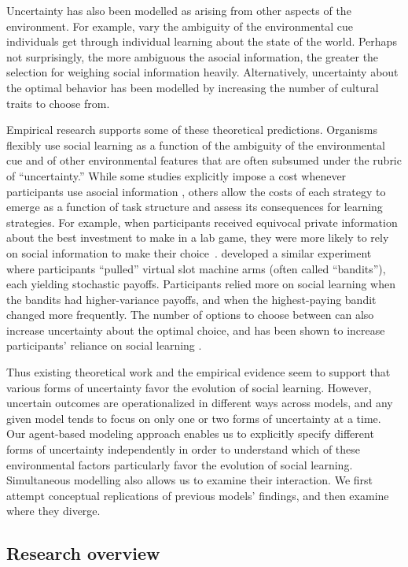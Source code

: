 \documentclass[letterpaper,11.5pt]{scrartcl}
\begin{document}
Uncertainty has also been modelled as arising from other aspects of the environment. 
For example,  vary the ambiguity of the environmental cue individuals get through individual learning about the state of the world. Perhaps not surprisingly, the more ambiguous the asocial information, the greater the selection for weighing social information heavily. Alternatively, uncertainty about the optimal behavior has been modelled by increasing the number of cultural traits to choose from. 

Empirical research supports some of these theoretical predictions. Organisms flexibly use social learning as a function of the ambiguity of the environmental cue and of other environmental features that are often subsumed under the rubric of ``uncertainty.''
While some studies explicitly impose a cost whenever participants use asocial
information \cite{Morgan2012,Atkisson2012}, 
others allow the costs of each strategy to emerge as a function of task structure and assess its consequences for learning strategies. 
For example, when participants received equivocal private information about the best investment to make in a lab game,
they were more likely to rely on social information to make their choice~\cite{Toelch2013}. 
 developed a similar experiment where participants ``pulled'' virtual slot machine arms (often called ``bandits''), each yielding stochastic payoffs. Participants relied more on social learning when the bandits had higher-variance payoffs, and when the highest-paying bandit changed more frequently. 
The number of options to choose between can also increase uncertainty about the optimal choice, and has been shown to increase participants' reliance on social learning \cite{Muthukrishna2016a}. 

Thus existing theoretical work and the empirical evidence seem to support that various forms of uncertainty favor the evolution of social learning. However, uncertain outcomes are operationalized in different ways across models, and any given model tends to focus on only one or two forms of uncertainty at a time. Our agent-based modeling approach enables us to explicitly specify different forms of uncertainty independently in order to understand which of these environmental factors particularly favor the evolution of social learning. Simultaneous modelling also allows us to examine their interaction. We first attempt conceptual replications of previous models' findings, and then examine where they diverge.

\subsection{Research overview}
\end{document}
